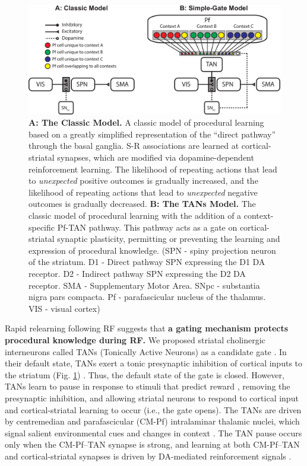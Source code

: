\documentclass[man,apacite,draftfirst]{apa6}
\begin{document}
\begin{figure}[h]
\centering \includegraphics[width=1.0\textwidth]{../figures/fig_models.pdf}
\caption{ \textbf{A: The Classic Model.} A classic model of procedural
  learning based on a greatly simplified representation of the ``direct pathway''
  through the basal ganglia. S-R associations are learned at cortical-striatal
  synapses, which are modified via dopamine-dependent reinforcement learning. The
  likelihood of repeating actions that lead to \emph{unexpected} positive outcomes
  is gradually increased, and the likelihood of repeating actions that lead to
  \emph{unexpected} negative outcomes is gradually decreased. \textbf{B: The TANs
    Model.} The classic model of procedural learning with the addition of a
  context-specific Pf-TAN pathway. This pathway acts as a gate on
  cortical-striatal synaptic plasticity, permitting or preventing the learning and
  expression of procedural knowledge. (SPN - spiny projection neuron of the
  striatum. D1 - Direct pathway SPN expressing the D1 DA receptor. D2 - Indirect
  pathway SPN expressing the D2 DA receptor. SMA - Supplementary Motor Area. SNpc
  - substantia nigra pars compacta. Pf - parafascicular nucleus of the thalamus.
  VIS - visual cortex)}
  \label{fig:models}
\end{figure}

Rapid relearning following RF suggests that \textbf{a gating mechanism protects
procedural knowledge during RF.} We proposed striatal cholinergic interneurons
called TANs (Tonically Active Neurons) as a candidate gate
\cite{crossley_erasing_2013}. In their default state, TANs exert a tonic
presynaptic inhibition of cortical inputs to the striatum (Fig.
\ref{fig:models}) \cite{calabresi_acetylcholine-mediated_2000}. Thus, the
default state of the gate is closed. However, TANs learn to pause in response to
stimuli that predict reward \cite{kimura1984tonically}, removing the presynaptic
inhibition, and allowing striatal neurons to respond to cortical input and
cortical-striatal learning to occur (i.e., the gate opens). The TANs are driven
by centremedian and parafascicular (CM-Pf) intralaminar thalamic nuclei, which
signal salient environmental cues and changes in context \cite{shimo_role_2001,
yamada_tonically_2004, apicella_responses_1997, ravel2006influence}. The TAN
pause occurs only when the CM-Pf--TAN synapse is strong, and learning at both
CM-Pf--TAN and cortical-striatal synapses is driven by DA-mediated reinforcement
signals \cite{suzuki2001dopamine,setyono1982effect}.
\end{document}
